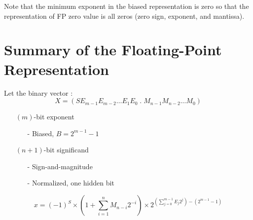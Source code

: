 \documentclass[12pt,openany, tikz,border=10pt]{book}
\begin{document}
Note that the minimum exponent in the biased representation is zero so that the representation of FP zero value is all zeros (zero sign, exponent, and mantissa).

\newpage
\section*{Summary of the Floating-Point Representation}
Let the binary vector : 
\[ X = (S E_{m-1}E_{m-2}\dots E_1E_0 \; . \; M_{n-1}M_{n-2}\dots M_0) \]

\begin{itemize}
    \item[] $(m)$-bit exponent
    \begin{itemize}
      \item[-] Biased, $B = 2^{m-1} - 1$
    \end{itemize}
    \item[] $(n + 1)$-bit significand
    \begin{itemize}
      \item[-] Sign-and-magnitude
      \item[-] Normalized, one hidden bit
    \end{itemize}

  \end{itemize}

  \[
x = (-1)^S \times \left(1 + \sum_{i=1}^{n} M_{n-i}2^{-i} \right) \times 2^{\left(\sum_{j=0}^{m-1} E_j2^j\right) - (2^{m-1} - 1)}
\]
\end{document}
